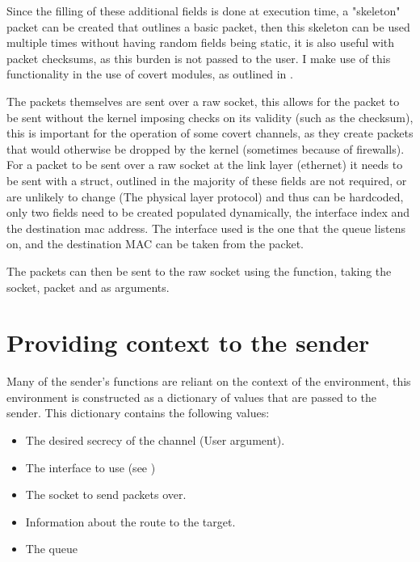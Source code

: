 Since the filling of these additional fields is done at execution time, a "skeleton" packet can be created that outlines a basic packet, then this skeleton can be used multiple times without having random fields being static, it is also useful with packet checksums, as this burden is not passed to the user. I make use of this functionality in the use of covert modules, as outlined in .

The packets themselves are sent over a raw socket, this allows for the packet to be sent without the kernel imposing checks on its validity (such as the checksum), this is important for the operation of some covert channels, as they create packets that would otherwise be dropped by the kernel (sometimes because of firewalls). For a packet to be sent over a raw socket at the link layer (ethernet) it needs to be sent with a  struct, outlined in \cite{packet_7} the majority of these fields are not required, or are unlikely to change (The physical layer protocol) and thus can be hardcoded, only two fields need to be created populated dynamically, the interface index and the destination mac address. The interface used is the one that the queue listens on, and the destination MAC can be taken from the packet.

The packets can then be sent to the raw socket using the  function, taking the socket, packet and  as arguments.

\section{Providing context to the sender}
\label{sec:context}

Many of the sender's functions are reliant on the context of the environment, this environment is constructed as a dictionary of values that are passed to the sender. This dictionary contains the following values:

\begin{itemize}
    \item The desired secrecy of the channel (User argument).
    \item The interface to use (see )
    \item The socket to send packets over.
    \item Information about the route to the target.
    \item The queue
\end{itemize}

